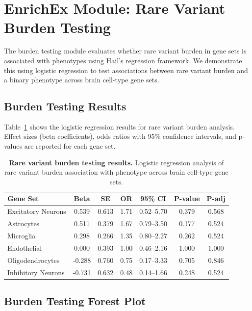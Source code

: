 \documentclass[11pt]{article}
\begin{document}
\section{EnrichEx Module: Rare Variant Burden Testing}

The burden testing module evaluates whether rare variant burden in gene sets is associated with phenotypes using Hail's regression framework. We demonstrate this using logistic regression to test associations between rare variant burden and a binary phenotype across brain cell-type gene sets.

\subsection{Burden Testing Results}

Table~\ref{tab:burden_results} shows the logistic regression results for rare variant burden analysis. Effect sizes (beta coefficients), odds ratios with 95\% confidence intervals, and p-values are reported for each gene set.

\begin{table}[H]
\centering
\caption{\textbf{Rare variant burden testing results.} Logistic regression analysis of rare variant burden association with phenotype across brain cell-type gene sets.}
\label{tab:burden_results}
\begin{tabular}{@{}lcccccc@{}}
\toprule
\textbf{Gene Set} & \textbf{Beta} & \textbf{SE} & \textbf{OR} & \textbf{95\% CI} & \textbf{P-value} & \textbf{P-adj} \\
\midrule
Excitatory Neurons & 0.539 & 0.613 & 1.71 & 0.52--5.70 & 0.379 & 0.568 \\
Astrocytes & 0.511 & 0.379 & 1.67 & 0.79--3.50 & 0.177 & 0.524 \\
Microglia & 0.298 & 0.266 & 1.35 & 0.80--2.27 & 0.262 & 0.524 \\
Endothelial & 0.000 & 0.393 & 1.00 & 0.46--2.16 & 1.000 & 1.000 \\
Oligodendrocytes & -0.288 & 0.760 & 0.75 & 0.17--3.33 & 0.705 & 0.846 \\
Inhibitory Neurons & -0.731 & 0.632 & 0.48 & 0.14--1.66 & 0.248 & 0.524 \\
\bottomrule
\end{tabular}
\end{table}

\subsection{Burden Testing Forest Plot}
\end{document}
